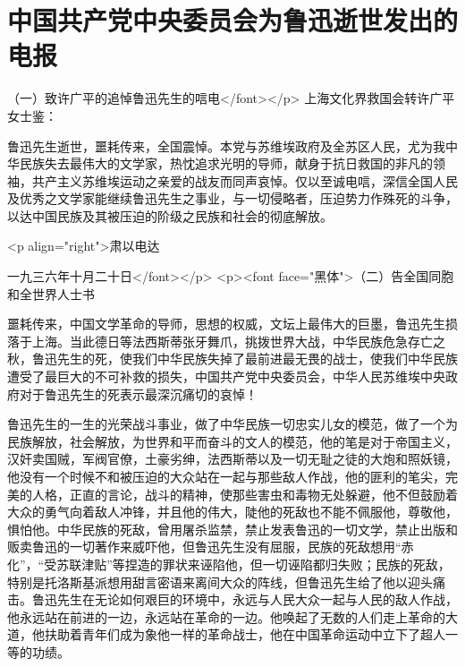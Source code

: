 \section[中国共产党中央委员会为鲁迅逝世发出的电报（一九三六年十月二十日）]{中国共产党中央委员会为鲁迅逝世发出的电报}


（一）致许广平的追悼鲁迅先生的唁电</font></p>
上海文化界救国会转许广平女士鉴：

鲁迅先生逝世，噩耗传来，全国震悼。本党与苏维埃政府及全苏区人民，尤为我中华民族失去最伟大的文学家，热忱追求光明的导师，献身于抗日救国的非凡的领袖，共产主义苏维埃运动之亲爱的战友而同声哀悼。仅以至诚电唁，深信全国人民及优秀之文学家能继续鲁迅先生之事业，与一切侵略者，压迫势力作殊死的斗争，以达中国民族及其被压迫的阶级之民族和社会的彻底解放。

<p align="right">肃以电达

 一九三六年十月二十日</font></p>
<p><font face="黑体">（二）告全国同胞和全世界人士书

噩耗传来，中国文学革命的导师，思想的权威，文坛上最伟大的巨墨，鲁迅先生损落于上海。当此德日等法西斯蒂张牙舞爪，挑拨世界大战，中华民族危急存亡之秋，鲁迅先生的死，使我们中华民族失掉了最前进最无畏的战士，使我们中华民族遭受了最巨大的不可补救的损失，中国共产党中央委员会，中华人民苏维埃中央政府对于鲁迅先生的死表示最深沉痛切的哀悼！

鲁迅先生的一生的光荣战斗事业，做了中华民族一切忠实儿女的模范，做了一个为民族解放，社会解放，为世界和平而奋斗的文人的模范，他的笔是对于帝国主义，汉奸卖国贼，军阀官僚，土豪劣绅，法西斯蒂以及一切无耻之徒的大炮和照妖镜，他没有一个时候不和被压迫的大众站在一起与那些敌人作战，他的匪利的笔尖，完美的人格，正直的言论，战斗的精神，使那些害虫和毒物无处躲避，他不但鼓励着大众的勇气向着敌人冲锋，并且他的伟大，陡他的死敌也不能不佩服他，尊敬他，惧怕他。中华民族的死敌，曾用屠杀监禁，禁止发表鲁迅的一切文学，禁止出版和贩卖鲁迅的一切著作来威吓他，但鲁迅先生没有屈服，民族的死敌想用“赤化”，“受苏联津贴”等捏造的罪状来诬陷他，但一切诬陷都归失败；民族的死敌，特别是托洛斯基派想用甜言密语来离间大众的阵线，但鲁迅先生给了他以迎头痛击。鲁迅先生在无论如何艰巨的环境中，永远与人民大众一起与人民的敌人作战，他永远站在前进的一边，永远站在革命的一边。他唤起了无数的人们走上革命的大道，他扶助着青年们成为象他一样的革命战士，他在中国革命运动中立下了超人一等的功绩。

